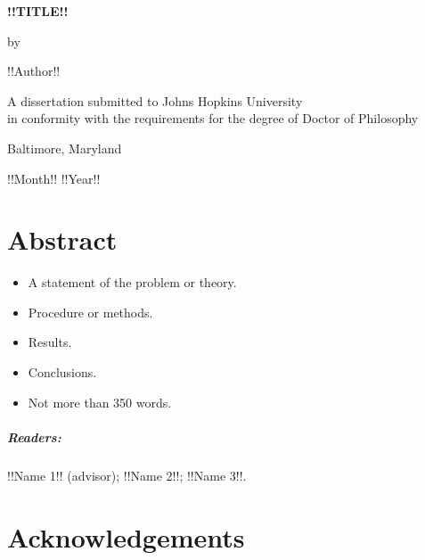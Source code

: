 \documentclass[12pt, oneside]{book}
\begin{document}
\frontmatter

\begin{center}
  \begin{singlespace}
    \vspace*{0.5in}

    \textbf{\uppercase{!!Title!!}}

    \vspace*{1in}

    by
    
    !!Author!!

    \vspace*{1.5in}

    A dissertation submitted to Johns Hopkins University\\in conformity with the requirements for the degree of Doctor of Philosophy

    \vspace*{0.5in}

    Baltimore, Maryland
    
    !!Month!! !!Year!!
  \end{singlespace}
\end{center}

\thispagestyle{empty}
\clearpage

\chapter{Abstract}

\begin{itemize}
  \item A statement of the problem or theory.
  \item Procedure or methods.
  \item Results.
  \item Conclusions.
  \item Not more than 350 words.
\end{itemize}

\paragraph{Readers:}

!!Name 1!! (advisor); !!Name 2!!; !!Name 3!!.

\chapter{Acknowledgements}

\lipsum[1] %
\end{document}
